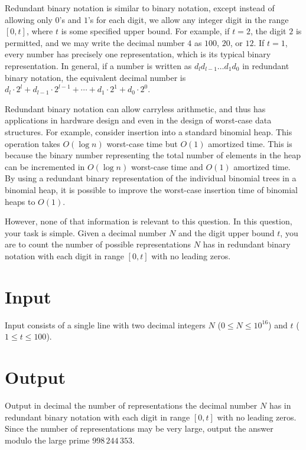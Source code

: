\documentclass[11pt,letterpaper]{article}
\title{}
\author{}
\date{\today}
\begin{document}
\maketitle

Redundant binary notation is similar to binary notation, except instead of allowing only $0$’s and $1$’s for each digit, we allow any integer digit in the range $[0, t]$, where $t$ is some specified upper bound. For example, if $t = 2$, the digit $2$ is permitted, and we may write the decimal number $4$ as $100$, $20$, or $12$. If $t=1$, every number has precisely one representation, which is its typical binary representation. In general, if a number is written as $d_l d_{l-1} \ldots d_1 d_0$ in redundant binary notation, the equivalent decimal number is $d_l\cdot2^l + d_{l-1}\cdot2^{l-1} + \cdots + d_1\cdot2^1 + d_0\cdot2^0$.

Redundant binary notation can allow carryless arithmetic, and thus has applications in hardware design and even in the design of worst-case data structures. For example, consider insertion into a standard binomial heap. This operation takes $O(\log n)$ worst-case time but $O(1)$ amortized time. This is because the binary number representing the total number of elements in the heap can be incremented in $O(\log n)$ worst-case time and $O(1)$ amortized time. By using a redundant binary representation of the individual binomial trees in a binomial heap, it is possible to improve the worst-case insertion time of binomial heaps to $O(1)$.

However, none of that information is relevant to this question. In this question, your task is simple. Given a decimal number $N$ and the digit upper bound $t$, you are to count the number of possible representations $N$ has in redundant binary notation with each digit in range $[0, t]$ with no leading zeros.

\section*{Input}

Input consists of a single line with two decimal integers $N$ ($0 \leq N \leq 10^{16}$) and $t$ ($1 \leq t \leq 100$).


\section*{Output}

Output in decimal the number of representations the decimal number $N$ has in redundant binary notation with each digit in range $[0, t]$ with no leading zeros. Since the number of representations may be very large, output the answer modulo the large prime $998\,244\,353$.



\end{document}
